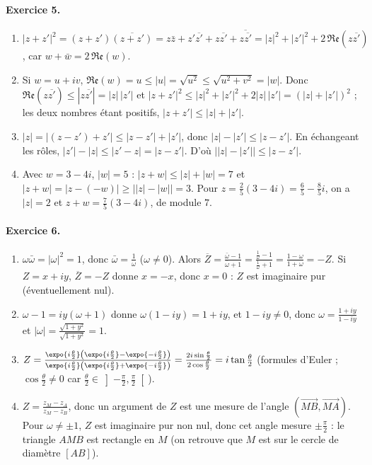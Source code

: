 \begin{corrige}
\paragraph{Exercice 5.}
\begin{enumerate}
\item $|z+z'|^2 = (z+z')\overline{(z+z')} = z\bar{z} + z'\overline{z'} + z\overline{z'} + \overline{z\overline{z'}}
      = |z|^2 + |z'|^2 + 2\,\mathfrak{Re}\left(z\overline{z'}\right)$,
      car $w + \bar{w} = 2\,\mathfrak{Re}(w)$.
\item Si $w = u + iv$, $\mathfrak{Re}(w) = u \leq |u| = \sqrt{u^2} \leq \sqrt{u^2+v^2} = |w|$.
      Donc $\mathfrak{Re}\left(z\overline{z'}\right) \leq |z\overline{z'}| = |z|\,|z'|$ et
      $|z+z'|^2 \leq |z|^2 + |z'|^2 + 2|z|\,|z'| = (|z| + |z'|)^2$ ; les deux nombres \'etant positifs, $|z+z'| \leq |z| + |z'|$.
\item $|z| = |(z-z') + z'| \leq |z - z'| + |z'|$, donc $|z| - |z'| \leq |z - z'|$.
      En \'echangeant les r\^oles, $|z'| - |z| \leq |z' - z| = |z - z'|$. D'o\`u $\left||z| - |z'|\right| \leq |z - z'|$.
\item Avec $w = 3 - 4i$, $|w| = 5$ : $|z + w| \leq |z| + |w| = 7$ et $|z + w| = |z - (-w)| \geq \left||z| - |w|\right| = 3$.
      Pour $z = \frac{2}{5}(3 - 4i) = \frac{6}{5} - \frac{8}{5}i$, on a $|z| = 2$ et $z + w = \frac{7}{5}(3-4i)$, de module $7$.
\end{enumerate}

\paragraph{Exercice 6.}
\begin{enumerate}
\item $\omega\bar{\omega} = |\omega|^2 = 1$, donc $\bar{\omega} = \frac{1}{\omega}$ ($\omega \neq 0$). Alors
      $\overline{Z} = \frac{\bar{\omega} - 1}{\bar{\omega} + 1} = \frac{\frac{1}{\omega} - 1}{\frac{1}{\omega} + 1} = \frac{1 - \omega}{1 + \omega} = -Z$.
      Si $Z = x + iy$, $\overline{Z} = -Z$ donne $x = -x$, donc $x = 0$ : $Z$ est imaginaire pur (\'eventuellement nul).
\item $\omega - 1 = iy(\omega + 1)$ donne $\omega(1 - iy) = 1 + iy$, et $1 - iy \neq 0$, donc
      $\omega = \frac{1 + iy}{1 - iy}$ et $|\omega| = \frac{\sqrt{1+y^2}}{\sqrt{1+y^2}} = 1$.
\item $Z = \frac{\expo{i\frac{\theta}{2}}\left(\expo{i\frac{\theta}{2}} - \expo{-i\frac{\theta}{2}}\right)}{\expo{i\frac{\theta}{2}}\left(\expo{i\frac{\theta}{2}} + \expo{-i\frac{\theta}{2}}\right)}
      = \frac{2i\sin\frac{\theta}{2}}{2\cos\frac{\theta}{2}} = i\tan\frac{\theta}{2}$
      (formules d'Euler ; $\cos\frac{\theta}{2} \neq 0$ car $\frac{\theta}{2} \in \left]-\frac{\pi}{2},\frac{\pi}{2}\right[$).
\item $Z = \frac{z_M - z_A}{z_M - z_B}$, donc un argument de $Z$ est une mesure de l'angle $\left(\overrightarrow{MB},\overrightarrow{MA}\right)$.
      Pour $\omega \neq \pm 1$, $Z$ est imaginaire pur non nul, donc cet angle mesure $\pm\frac{\pi}{2}$ : le triangle $AMB$ est rectangle en $M$
      (on retrouve que $M$ est sur le cercle de diam\`etre $[AB]$).
\end{enumerate}


\end{corrige}
